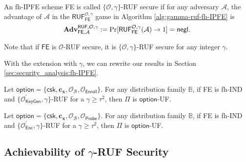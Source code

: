 \begin{definition}

	An fh-IPFE scheme \textsf{FE} is called $\{ \mathcal{O}, \gamma \}$-RUF secure if for any adversary $\mathcal{A}$, the advantage of $\mathcal{A}$ in the $\textsf{RUF}^{\mathcal{O}, \gamma}_\textsf{FE}$ game in Algorithm \ref{alg:gamma-ruf-fh-IPFE} is
\[
	\mathbf{Adv}_{\textsf{FE}, \mathcal{A}}^{\textsf{RUF}, \mathcal{O}, \gamma} := \Pr[\textsf{RUF}^{\mathcal{O}, \gamma}_{\textsf{FE}}(\mathcal{A}) \to 1 ] = \mathsf{negl}.
\]

\noindent Note that if $\textsf{FE}$ is $\mathcal{O}$-RUF secure, it is $\{ \mathcal{O}, \gamma \}$-RUF secure for any integer $\gamma$.
\end{definition}

With the extension with $\gamma$, we can rewrite our results in Section \ref{sec:security_analysis:fh-IPFE}.


\begin{theorem}
\label{thm:fh-IPFE:ind-gamma-ruf-OB-Enroll}
	Let $\textsf{option} = \{ \textsf{csk}, \mathbf{c_x}, \mathcal{O}_\mathcal{B}, \mathcal{O}_{\textsf{Enroll}} \}$. For any distribution family $\mathbb{B}$, if \textsf{FE} is fh-IND and $\{ \mathcal{O}^\prime_{\textsf{KeyGen}}, \gamma \}$-RUF for a $\gamma \geq \tau^2$, then $\Pi$ is $\textsf{option}$-UF. 
\end{theorem}

\begin{theorem}
\label{thm:fh-IPFE:ind-gamma-ruf-OB-Probe}
	Let $\textsf{option} = \{\textsf{csk}, \mathbf{c_x}, \mathcal{O}_\mathcal{B}, \mathcal{O}_\textsf{Probe}\}$. For any distribution family $\mathbb{B}$, if \textsf{FE} is fh-IND and $\{ \mathcal{O}^\prime_{\textsf{Enc}}, \gamma \}$-RUF for a $\gamma \geq \tau^2$, then $\Pi$ is $\textsf{option}$-UF. 
\end{theorem}

\subsection{Achievability of $\gamma$-RUF Security}


